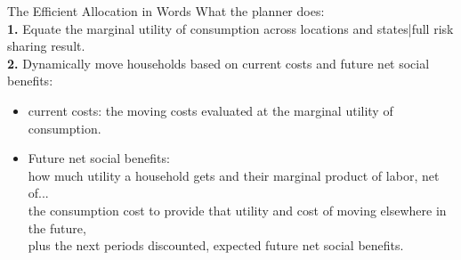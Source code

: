 \documentclass[9pt,pdftex,aspectratio=1610]{beamer}
\theoremstyle{definition}
\begin{document}
\begin{frame}[t]{The Efficient Allocation in Words}
What the planner does:\\
\bigskip
\textbf{1.} Equate the marginal utility of consumption across locations and states|full risk sharing result.\\
\bigskip
\textbf{2.} Dynamically move households based on current costs and future net social benefits:
\begin{itemize}
\smallskip
\item current costs: the moving costs evaluated at the marginal utility of consumption.
\smallskip
\item Future net social benefits:\\
\smallskip
how much utility a household gets and their marginal product of labor, net of...\\
\smallskip
the consumption cost to provide that utility and cost of moving elsewhere in the future,\\
\smallskip
plus the next periods discounted, expected future net social benefits.
\end{itemize}
\end{frame}

\end{document}

